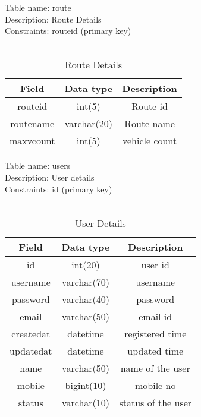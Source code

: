 Table name: route\\
Description: Route Details\\
Constraints: routeid (primary key)\\
\\
\begin{table}[ht]
\begin{tabular}{|c|c|c|} 
\hline
Field  & Data type & Description \\  
\hline
routeid& int(5)& Route id \\ 
\hline
routename&  varchar(20) & Route name \\
\hline
maxvcount&  int(5) & vehicle count \\
\hline
\end{tabular}
\caption{Route Details }
\end{table}

Table name: users\\
Description: User details\\
Constraints: id (primary key)\\
\\
\begin{table}[ht]
\begin{tabular}{|c|c|c|} 
\hline
Field  & Data type & Description \\  
\hline
id& int(20)& user id \\ 
\hline
username&  varchar(70) & username \\
\hline
password&  varchar(40) & password \\
\hline
email &  varchar(50) & email id \\
\hline
createdat &  datetime & registered time \\
\hline
updatedat &  datetime & updated time \\
\hline
name &  varchar(50) & name of the user \\
\hline
mobile &  bigint(10) & mobile no \\
\hline
status &  varchar(10) & status of the user \\
\hline
\end{tabular}
\caption{User Details }
\end{table}


